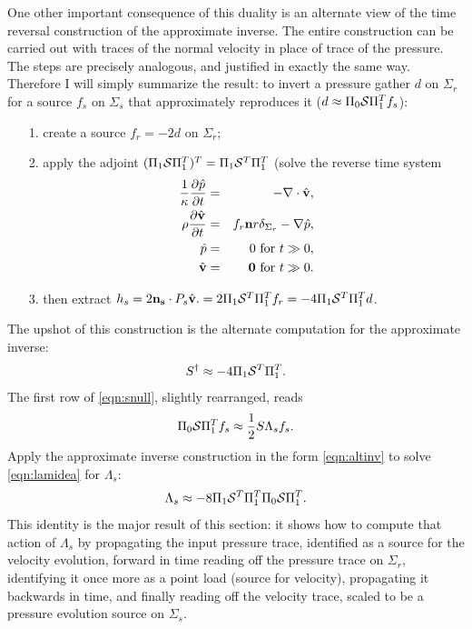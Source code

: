 \documentclass[georeport,12pt]{geophysics}
\newcommand{\bv}{\mathbf{v}}
\begin{document}
One other important consequence of this duality is an alternate view
of the time reversal construction of the approximate inverse. The
entire construction can be carried out with traces of the normal
velocity in place of trace of the pressure. The steps are precisely
analogous, and justified in exactly the same way. Therefore I will
simply summarize the result:
to invert a pressure gather $d$ on $\Sigma_r$
for a source $f_s$ on $\Sigma_s$ that approximately reproduces it ($d
\approx \Pi_0{\cal S}\Pi_1^Tf_s$):
\begin{itemize}
\item[1. ] create a source $f_r = - 2d$ on $\Sigma_r$;
\item[2. ] apply the adjoint $(\Pi_1{\cal S}\Pi_1^T)^T=\Pi_1{\cal
    S}^T\Pi_1^T$ (solve the reverse time system
  \begin{eqnarray}
  \label{eqn:awerecglobvz}
  \frac{1}{\kappa}\frac{\partial\hat{p}}{\partial t} & = & 
                                                      - \nabla \cdot \hat{\bv}, \nonumber \\
  \rho\frac{\partial \hat{\bv}}{\partial t} & = & f_r {\bf n}r
  \delta_{\Sigma_r} - \nabla \hat{p}, \nonumber \\
  \hat{p} & = & 0 \mbox{ for } t\gg 0, \nonumber \\
    \hat{\bv} & = & {\bf 0} \mbox{ for } t \gg 0.
  \end{eqnarray}
\item[3. ]
  then extract $h_s=2{\bf n_s}\cdot P_s\hat{\bv}. = 2\Pi_1{\cal
    S}^T\Pi_1^Tf_r=-4\Pi_1{\cal S}^T\Pi_1^Td$.
\end{itemize}
The upshot of this construction is the alternate computation for the
approximate inverse:
\begin{equation}
  \label{eqn:altinv}
  S^{\dagger}  \approx -4\Pi_1{\cal S}^T\Pi_1^T.
\end{equation}
The first row of
\ref{eqn:snull}, slightly rearranged, reads
\begin{equation}
  \label{eqn:lamidea}
  \Pi_0{\cal S}\Pi_1^T f_s \approx  \frac{1}{2} S\Lambda_sf_s.
\end{equation}
Apply the approximate inverse construction in the form
\ref{eqn:altinv} to solve \ref{eqn:lamidea} for $\Lambda_s$:
\begin{equation}
  \label{eqn:lamident}
  \Lambda_s \approx -8\Pi_1{\cal S}^T\Pi_1^T\Pi_0 {\cal S}\Pi_1^T.
\end{equation}
This identity is the major result of this section: it shows how
to compute that action of $\Lambda_s$ by propagating the input
pressure trace, identified as a source for the velocity evolution,
forward in time 
reading off the pressure trace on $\Sigma_r$, identifying it once more as
a point load (source for velocity), propagating it backwards in time, and finally reading off the velocity trace, scaled to be a
pressure evolution source on $\Sigma_s$. 
\end{document}
